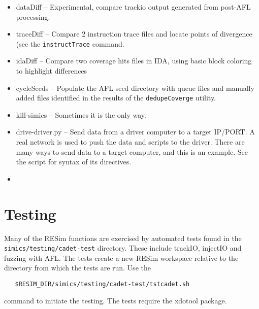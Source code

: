 \documentclass[titlepage]{article}
\begin{document}
\begin{itemize}
\item dataDiff -- Experimental, compare trackio output generated from post-AFL processing.
\item traceDiff -- Compare 2 instruction trace files and locate points of divergence (see the {\tt instructTrace} command.
\item idaDiff -- Compare two coverage hits files in IDA, using basic block coloring to highlight differences
\item cycleSeeds -- Populate the AFL seed directory with queue files and manually added files identified in the results of the {\tt dedupeCoverge} utility.
\item kill-simics -- Sometimes it is the only way.
\item drive-driver.py -- Send data from a driver computer to a target IP/PORT.  A real network is used to push the data and scripts
to the driver.  There are many ways to send data to a target computer, and this is an example.  See the script for syntax of its directives.
\item 
\end{itemize}

\section{Testing}
Many of the RESim functions are exercised by automated tests found in the {\tt simics/testing/cadet-test} directory.
These include trackIO, injectIO and fuzzing with AFL.  The tests create a new RESim workspace relative to
the directory from which the tests are run.  Use the
\begin{verbatim}
   $RESIM_DIR/simics/testing/cadet-test/tstcadet.sh
\end{verbatim}
\noindent command to initiate the testing.  The tests require the xdotool package.
\end{document}

